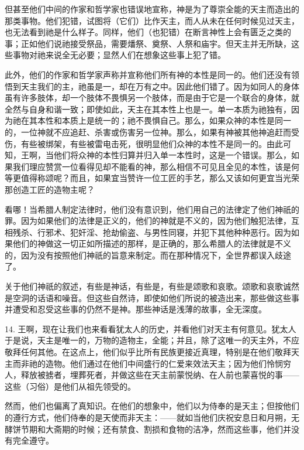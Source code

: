 但甚至他们中间的作家和哲学家也错误地宣称，神是为了尊崇全能的天主而造出的那类事物。他们犯错，试图将（它们）比作天主，而人从未在任何时候见过天主，也无法看到祂是什么样子。同样，他们（也犯错）在断言神性上会有匮乏之类的事；正如他们说祂接受祭品，需要燔祭、奠祭、人祭和庙宇。但天主并无所缺，这些事物对祂来说全无必要；显然人们在想象这些事上犯了错。\par

此外，他们的作家和哲学家声称并宣称他们所有神的本性是同一的。他们还没有领悟到天主我们的主，祂虽是一，却在万有之中。因此他们错了。因为如同人的身体虽有许多肢体，却一个肢体不畏惧另一个肢体，而是由于它是一个联合的身体，就全然与自身和谐一致；即使如此，天主在其本性上也是一。单一本质为祂独有，因为祂在其本性和本质上是统一的；祂不畏惧自己。那么，如果众神的本性是同一的，一位神就不应追赶、杀害或伤害另一位神。那么，如果有神被其他神追赶而受伤，有些被绑架，有些被雷电击死，很明显他们众神的本性不是同一的。由此可知，王啊，当他们将众神的本性归算并归入单一本性时，这是一个错误。那么，如果我们理应赞赏一位看得见却不能看的神，那么相信不可见且全见的本性，该是何等更值得称颂呢？而且，如果宜当赞许一位工匠的手艺，那么又该如何更宜当光荣那创造工匠的造物主呢？\par

看哪！当希腊人制定法律时，他们没有意识到，他们用自己的法律定了他们神祇的罪。因为如果他们的法律是正义的，他们的神就是不义的，因为他们触犯法律，互相残杀、行邪术、犯奸淫、抢劫偷盗、与男性同寝，并犯下其他种种恶行。因为如果他们的神做这一切正如所描述的那样，是正确的，那么希腊人的法律就是不义的，因为没有按照他们神祇的旨意来制定。而在那种情况下，全世界都误入歧途了。\par

关于他们神祇的叙述，有些是神话，有些是，有些是颂歌和哀歌。颂歌和哀歌诚然是空洞的话语和噪音。但这些自然诗，即使如他们所说的被造出来，那些做这些事并遭受和忍受这些事的仍然不是神。那些神话是浅薄的故事，全无深度。\par

14. 王啊，现在让我们也来看看犹太人的历史，并看他们对天主有何意见。犹太人于是说，天主是唯一的，万物的造物主，全能；并且，除了这唯一的天主外，不应敬拜任何其他。在这点上，他们似乎比所有民族更接近真理，特别是在他们敬拜天主而非祂的造物。他们通过在他们中间盛行的仁爱来效法天主；因为他们怜悯穷人，释放被掳者，埋葬死者，并做这些在天主前蒙悦纳、在人前也蒙喜悦的事——这些（习俗）是他们从祖先领受的。\par

然而，他们也偏离了真知识。在他们的想象中，他们以为侍奉的是天主；但按他们的遵行方式，他们侍奉的是天使而非天主：——就如当他们庆祝安息日和月朔，无酵饼节期和大斋期的时候；还有禁食、割损和食物的洁净，然而这些事，他们并没有完全遵守。\par

